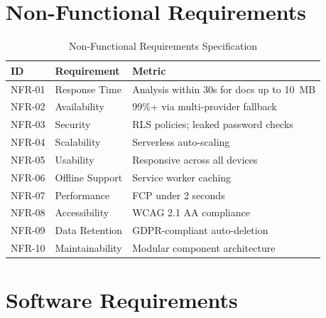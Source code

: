 \documentclass[12pt,a4paper,oneside]{report}
\begin{document}
\section{Non-Functional Requirements}

\begin{table}[htbp]
\centering
\caption{Non-Functional Requirements Specification}
\label{tab:nfr}
\small
\begin{tabular}{|p{1.2cm}|p{7cm}|p{4.5cm}|}
\hline
\textbf{ID} & \textbf{Requirement} & \textbf{Metric} \\
\hline
NFR-01 & Response Time & Analysis within 30s for docs up to 10~MB \\ \hline
NFR-02 & Availability & 99\%+ via multi-provider fallback \\ \hline
NFR-03 & Security & RLS policies; leaked password checks \\ \hline
NFR-04 & Scalability & Serverless auto-scaling \\ \hline
NFR-05 & Usability & Responsive across all devices \\ \hline
NFR-06 & Offline Support & Service worker caching \\ \hline
NFR-07 & Performance & FCP under 2 seconds \\ \hline
NFR-08 & Accessibility & WCAG 2.1 AA compliance \\ \hline
NFR-09 & Data Retention & GDPR-compliant auto-deletion \\ \hline
NFR-10 & Maintainability & Modular component architecture \\ \hline
\end{tabular}
\end{table}

\section{Software Requirements}
\end{document}

